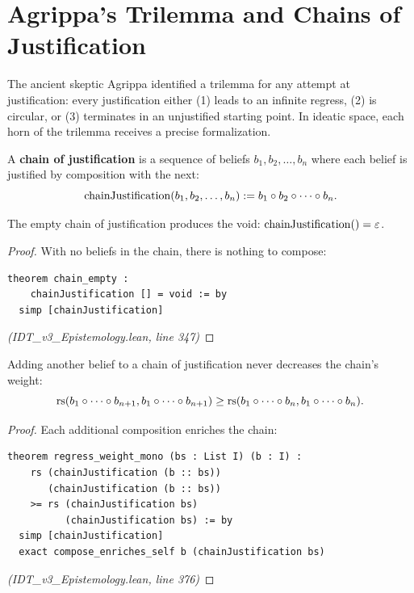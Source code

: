 \section{Agrippa's Trilemma and Chains of Justification}

The ancient skeptic Agrippa identified a trilemma for any attempt at justification:
every justification either (1) leads to an infinite regress, (2) is circular, or
(3) terminates in an unjustified starting point. In ideatic space, each horn of
the trilemma receives a precise formalization.

\begin{definition}
\label{def:chain-justification}
A \textbf{chain of justification} is a sequence of beliefs $b_1, b_2, \ldots, b_n$
where each belief is justified by composition with the next:
\[
  \mathrm{chainJustification}(b_1, b_2, \ldots, b_n) := b_1 \circ b_2 \circ \cdots \circ b_n.
\]
\end{definition}

\begin{theorem}
\label{thm:chain-empty}
The empty chain of justification produces the void:
$\mathrm{chainJustification}() = \varepsilon$.
\end{theorem}

\begin{proof}
With no beliefs in the chain, there is nothing to compose:
\begin{lstlisting}
theorem chain_empty :
    chainJustification [] = void := by
  simp [chainJustification]
\end{lstlisting}
\textit{(IDT\_v3\_Epistemology.lean, line 347)}
\end{proof}

\begin{theorem}
\label{thm:regress-weight-mono}
Adding another belief to a chain of justification never decreases the chain's weight:
\[
  \mathrm{rs}(b_1 \circ \cdots \circ b_{n+1}, b_1 \circ \cdots \circ b_{n+1})
  \geq \mathrm{rs}(b_1 \circ \cdots \circ b_n, b_1 \circ \cdots \circ b_n).
\]
\end{theorem}

\begin{proof}
Each additional composition enriches the chain:
\begin{lstlisting}
theorem regress_weight_mono (bs : List I) (b : I) :
    rs (chainJustification (b :: bs))
       (chainJustification (b :: bs))
    >= rs (chainJustification bs)
          (chainJustification bs) := by
  simp [chainJustification]
  exact compose_enriches_self b (chainJustification bs)
\end{lstlisting}
\textit{(IDT\_v3\_Epistemology.lean, line 376)}
\end{proof}

